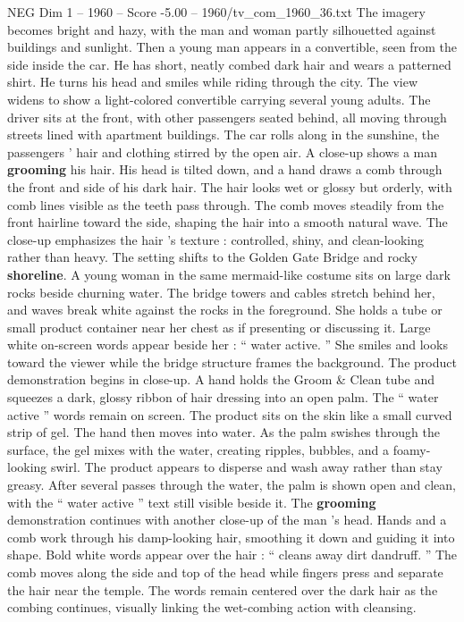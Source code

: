 \begin{textsample}{NEG Dim 1 – 1960 – Score -5.00 – 1960/tv\_com\_1960\_36.txt}
The imagery becomes bright and hazy, with the man and woman partly silhouetted against buildings and sunlight.
Then a young man appears in a convertible, seen from the side inside the car.
He has short, neatly combed dark hair and wears a patterned shirt.
He turns his head and smiles while riding through the city.
The view widens to show a light-colored convertible carrying several young adults.
The driver sits at the front, with other passengers seated behind, all moving through streets lined with apartment buildings.
The car rolls along in the sunshine, the passengers ’ hair and clothing stirred by the open air.
A close-up shows a man \textbf{grooming} his hair.
His head is tilted down, and a hand draws a comb through the front and side of his dark hair.
The hair looks wet or glossy but orderly, with comb lines visible as the teeth pass through.
The comb moves steadily from the front hairline toward the side, shaping the hair into a smooth natural wave.
The close-up emphasizes the hair ’s texture : controlled, shiny, and clean-looking rather than heavy.
The setting shifts to the Golden Gate Bridge and rocky \textbf{shoreline}.
A young woman in the same mermaid-like costume sits on large dark rocks beside churning water.
The bridge towers and cables stretch behind her, and waves break white against the rocks in the foreground.
She holds a tube or small product container near her chest as if presenting or discussing it.
Large white on-screen words appear beside her : “ water active. ” She smiles and looks toward the viewer while the bridge structure frames the background.
The product demonstration begins in close-up.
A hand holds the Groom \& Clean tube and squeezes a dark, glossy ribbon of hair dressing into an open palm.
The “ water active ” words remain on screen.
The product sits on the skin like a small curved strip of gel.
The hand then moves into water.
As the palm swishes through the surface, the gel mixes with the water, creating ripples, bubbles, and a foamy-looking swirl.
The product appears to disperse and wash away rather than stay greasy.
After several passes through the water, the palm is shown open and clean, with the “ water active ” text still visible beside it.
The \textbf{grooming} demonstration continues with another close-up of the man ’s head.
Hands and a comb work through his damp-looking hair, smoothing it down and guiding it into shape.
Bold white words appear over the hair : “ cleans away dirt dandruff. ” The comb moves along the side and top of the head while fingers press and separate the hair near the temple.
The words remain centered over the dark hair as the combing continues, visually linking the wet-combing action with cleansing.

\end{textsample}
